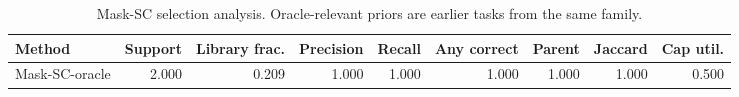 \begin{table}[ht]
    \caption{Mask-SC selection analysis. Oracle-relevant priors are earlier tasks from the same family.}
    \label{tbl:masksc_selection}
    \centering
    \scriptsize
    \begin{tabular}{lrrrrrrrr}
    \toprule
Method & Support & Library frac. & Precision & Recall & Any correct & Parent & Jaccard & Cap util. \\
    \midrule
Mask-SC-oracle & 2.000 & 0.209 & 1.000 & 1.000 & 1.000 & 1.000 & 1.000 & 0.500 \\
    \bottomrule
    \end{tabular}
\end{table}
